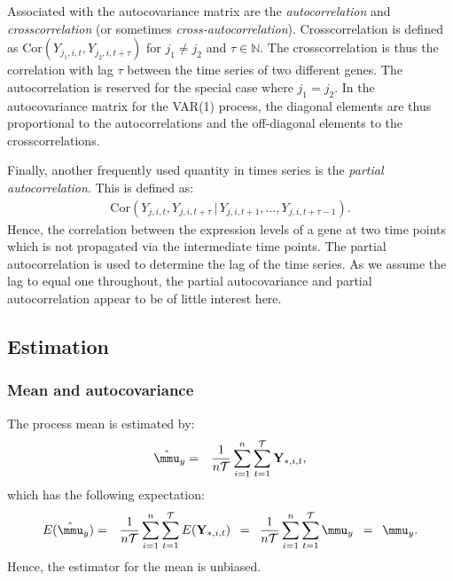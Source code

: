 \documentclass[a4paper]{article}
\theoremstyle{myexamplestyle}
\begin{document}
Associated with the autocovariance matrix are the {\it autocorrelation} and {\it crosscorrelation} (or sometimes {\it cross-autocorrelation}). Crosscorrelation is defined as $\mbox{Cor}(Y_{j_1,i,t}, Y_{j_2,i,t+\tau})$ for $j_1 \not= j_2$ and $\tau \in \mathbb{N}$. The crosscorrelation is thus the correlation with lag $\tau$ between the time series of two different genes. The autocorrelation is reserved for the special case where $j_1 = j_2$. In the autocovariance matrix for the VAR(1) process, the diagonal elements are thus proportional to the autocorrelations and the off-diagonal elements to the crosscorrelations.

Finally, another frequently used quantity in times series is the {\it partial autocorrelation}. This is defined as:
\begin{eqnarray*}
\mbox{Cor}(Y_{j,i,t}, Y_{j,i,t+\tau} \, | \, Y_{j,i,t+1}, \ldots, Y_{j,i,t+\tau-1}).
\end{eqnarray*}
Hence, the correlation between the expression levels of a gene at two time points which is not propagated via the intermediate time points. The partial autocorrelation is used to determine the lag of the time series. As we assume the lag to equal one throughout, the partial autocovariance and partial autocorrelation appear to be of little interest here.



\subsection{Estimation}
\subsubsection{Mean and autocovariance}
The process mean is estimated by:
\begin{eqnarray*}
\hat{\mmu}_y & = & \frac{1}{n\mathcal{T}} \sum_{i=1}^n \sum_{t=1}^{\mathcal{T}} \mathbf{Y}_{\ast,i,t},
\end{eqnarray*}
which has the following expectation:
\begin{eqnarray*}
E(\hat{\mmu}_y) & = & \frac{1}{n\mathcal{T}} \sum_{i=1}^n \sum_{t=1}^{\mathcal{T}} E( \mathbf{Y}_{\ast,i,t} ) \, \, \, = \, \, \, \frac{1}{n\mathcal{T}} \sum_{i=1}^n \sum_{t=1}^{\mathcal{T}} \mmu_y
\, \, \, = \, \, \,  \mmu_y.
\end{eqnarray*}
Hence, the estimator for the mean is unbiased.
\end{document}
